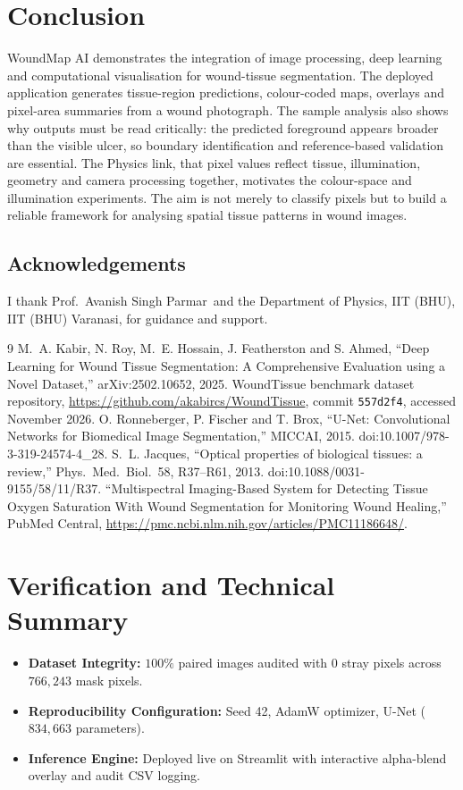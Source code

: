\documentclass[12pt,a4paper]{article}
\newcommand{\Supervisor}{Prof.\ Avanish Singh Parmar}
\newcommand{\Dept}{Department of Physics, IIT (BHU)}
\begin{document}
\section{Conclusion}
WoundMap AI demonstrates the integration of image processing, deep learning and computational visualisation for wound-tissue segmentation. The deployed application generates tissue-region predictions, colour-coded maps, overlays and pixel-area summaries from a wound photograph. The sample analysis also shows why outputs must be read critically: the predicted foreground appears broader than the visible ulcer, so boundary identification and reference-based validation are essential. The Physics link, that pixel values reflect tissue, illumination, geometry and camera processing together, motivates the colour-space and illumination experiments. The aim is not merely to classify pixels but to build a reliable framework for analysing spatial tissue patterns in wound images.

\subsection*{Acknowledgements}
I thank \Supervisor\ and the \Dept, IIT (BHU) Varanasi, for guidance and support.

\begin{thebibliography}{9}
 M.~A. Kabir, N. Roy, M.~E. Hossain, J. Featherston and S. Ahmed, ``Deep Learning for Wound Tissue Segmentation: A Comprehensive Evaluation using a Novel Dataset,'' arXiv:2502.10652, 2025.
 WoundTissue benchmark dataset repository, \url{https://github.com/akabircs/WoundTissue}, commit \texttt{557d2f4}, accessed November 2026.
 O. Ronneberger, P. Fischer and T. Brox, ``U-Net: Convolutional Networks for Biomedical Image Segmentation,'' MICCAI, 2015. doi:10.1007/978-3-319-24574-4\_28.
 S.~L. Jacques, ``Optical properties of biological tissues: a review,'' Phys.\ Med.\ Biol.\ 58, R37--R61, 2013. doi:10.1088/0031-9155/58/11/R37.
 ``Multispectral Imaging-Based System for Detecting Tissue Oxygen Saturation With Wound Segmentation for Monitoring Wound Healing,'' PubMed Central, \url{https://pmc.ncbi.nlm.nih.gov/articles/PMC11186648/}.
\end{thebibliography}

\appendix
\section{Verification and Technical Summary}
\begin{itemize}
\item \textbf{Dataset Integrity:} $100\%$ paired images audited with $0$ stray pixels across $766{,}243$ mask pixels.
\item \textbf{Reproducibility Configuration:} Seed 42, AdamW optimizer, U-Net ($834{,}663$ parameters).
\item \textbf{Inference Engine:} Deployed live on Streamlit with interactive alpha-blend overlay and audit CSV logging.
\end{itemize}
\end{document}
